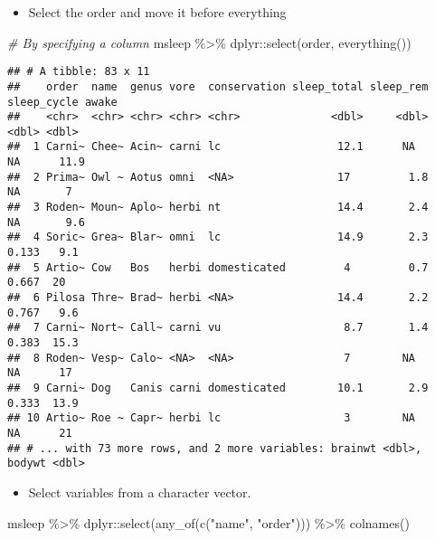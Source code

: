 \documentclass[
]{book}
\newenvironment{Shaded}{\begin{snugshade}}{\end{snugshade}}
\newcommand{\CommentTok}[1]{\textcolor[rgb]{0.56,0.35,0.01}{\textit{#1}}}
\newcommand{\FunctionTok}[1]{\textcolor[rgb]{0.00,0.00,0.00}{#1}}
\newcommand{\NormalTok}[1]{#1}
\newcommand{\SpecialCharTok}[1]{\textcolor[rgb]{0.00,0.00,0.00}{#1}}
\newcommand{\StringTok}[1]{\textcolor[rgb]{0.31,0.60,0.02}{#1}}
\providecommand{\tightlist}{%
  \setlength{\itemsep}{0pt}\setlength{\parskip}{0pt}}
\begin{document}
\begin{itemize}
\tightlist
\item
  Select the order and move it before everything
\end{itemize}

\begin{Shaded}
\begin{Highlighting}[]
\CommentTok{\# By specifying a column}
\NormalTok{msleep }\SpecialCharTok{\%\textgreater{}\%}
\NormalTok{  dplyr}\SpecialCharTok{::}\FunctionTok{select}\NormalTok{(order, }\FunctionTok{everything}\NormalTok{())}
\end{Highlighting}
\end{Shaded}

\begin{verbatim}
## # A tibble: 83 x 11
##    order  name  genus vore  conservation sleep_total sleep_rem sleep_cycle awake
##    <chr>  <chr> <chr> <chr> <chr>              <dbl>     <dbl>       <dbl> <dbl>
##  1 Carni~ Chee~ Acin~ carni lc                  12.1      NA        NA      11.9
##  2 Prima~ Owl ~ Aotus omni  <NA>                17         1.8      NA       7  
##  3 Roden~ Moun~ Aplo~ herbi nt                  14.4       2.4      NA       9.6
##  4 Soric~ Grea~ Blar~ omni  lc                  14.9       2.3       0.133   9.1
##  5 Artio~ Cow   Bos   herbi domesticated         4         0.7       0.667  20  
##  6 Pilosa Thre~ Brad~ herbi <NA>                14.4       2.2       0.767   9.6
##  7 Carni~ Nort~ Call~ carni vu                   8.7       1.4       0.383  15.3
##  8 Roden~ Vesp~ Calo~ <NA>  <NA>                 7        NA        NA      17  
##  9 Carni~ Dog   Canis carni domesticated        10.1       2.9       0.333  13.9
## 10 Artio~ Roe ~ Capr~ herbi lc                   3        NA        NA      21  
## # ... with 73 more rows, and 2 more variables: brainwt <dbl>, bodywt <dbl>
\end{verbatim}

\begin{itemize}
\tightlist
\item
  Select variables from a character vector.
\end{itemize}

\begin{Shaded}
\begin{Highlighting}[]
\NormalTok{msleep }\SpecialCharTok{\%\textgreater{}\%}
\NormalTok{  dplyr}\SpecialCharTok{::}\FunctionTok{select}\NormalTok{(}\FunctionTok{any\_of}\NormalTok{(}\FunctionTok{c}\NormalTok{(}\StringTok{"name"}\NormalTok{, }\StringTok{"order"}\NormalTok{))) }\SpecialCharTok{\%\textgreater{}\%}
  \FunctionTok{colnames}\NormalTok{()}
\end{Highlighting}
\end{Shaded}
\end{document}

